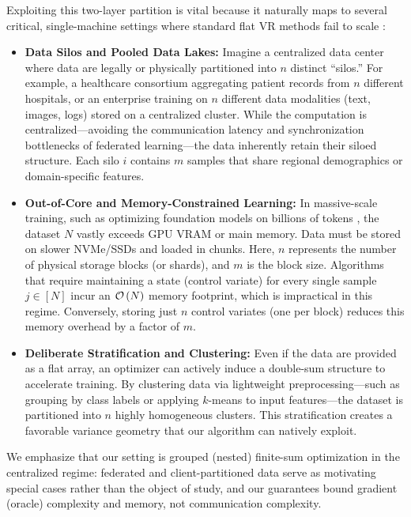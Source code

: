 \documentclass{article}
\newcommand{\cO}{{\cal O}}
\newcommand{\rb}[1]{\left(#1\right)}
\theoremstyle{plain}
\begin{document}
Exploiting this two-layer partition is vital because it naturally maps to several critical, single-machine settings where standard flat VR methods fail to scale \citep{shai_book, Bottou2012, goodfellow2016deep}:
\begin{itemize}[leftmargin=*]
    \item \textbf{Data Silos and Pooled Data Lakes:} Imagine a centralized data center where data are legally or physically partitioned into $n$ distinct ``silos.'' For example, a healthcare consortium aggregating patient records from $n$ different hospitals, or an enterprise training on $n$ different data modalities (text, images, logs) stored on a centralized cluster. While the computation is centralized—avoiding the communication latency and synchronization bottlenecks of federated learning—the data inherently retain their siloed structure. Each silo $i$ contains $m$ samples that share regional demographics or domain-specific features.
    \item \textbf{Out-of-Core and Memory-Constrained Learning:} In massive-scale training, such as optimizing foundation models on billions of tokens \citep{radford2019language, brown2020language}, the dataset $N$ vastly exceeds GPU VRAM or main memory. Data must be stored on slower NVMe/SSDs and loaded in chunks. Here, $n$ represents the number of physical storage blocks (or shards), and $m$ is the block size. Algorithms that require maintaining a state (control variate) for every single sample $j \in [N]$ incur an $\cO\rb{N}$ memory footprint, which is impractical in this regime. Conversely, storing just $n$ control variates (one per block) reduces this memory overhead by a factor of $m$.
    \item \textbf{Deliberate Stratification and Clustering:} Even if the data are provided as a flat array, an optimizer can actively induce a double-sum structure to accelerate training. By clustering data via lightweight preprocessing—such as grouping by class labels or applying $k$-means to input features—the dataset is partitioned into $n$ highly homogeneous clusters. This stratification creates a favorable variance geometry that our algorithm can natively exploit.
\end{itemize}

We emphasize that our setting is grouped (nested) finite-sum optimization in the centralized regime: federated and client-partitioned data serve as motivating special cases rather than the object of study, and our guarantees bound gradient (oracle) complexity and memory, not communication complexity.
\end{document}
